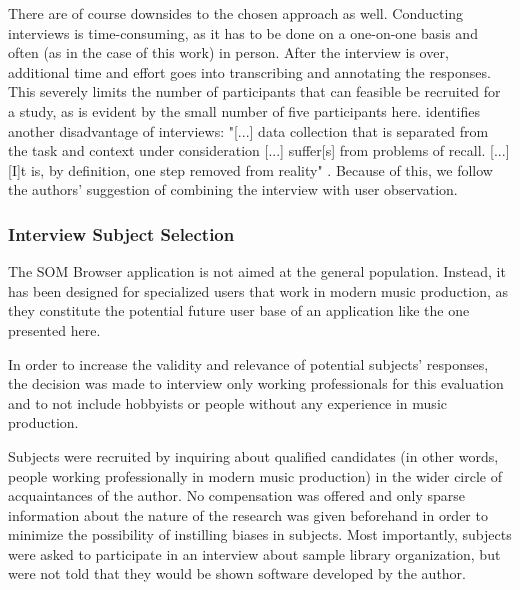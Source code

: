 \smallskip

There are of course downsides to the chosen approach as well. Conducting
interviews is time-consuming, as it has to be done on a one-on-one basis and
often (as in the case of this work) in person. After the interview is over,
additional time and effort goes into transcribing and annotating the responses.
This severely limits the number of participants that can feasible be recruited
for a study, as is evident by the small number of five participants here.
\citet{lazar2017} identifies another disadvantage of interviews: "[...] data
collection that is separated from the task and context under consideration [...]
suffer[s] from problems of recall. [...] [I]t is, by definition, one step
removed from reality" \citep[p.188ff.]{lazar2017}. Because of this, we follow
the authors' suggestion of combining the interview with user observation.

\subsubsection{Interview Subject Selection}
\label{subsubsec:subject_selection}
The SOM Browser application is not aimed at the general population. Instead, it
has been designed for specialized users that work in modern music production, as
they constitute the potential future user base of an application like the one
presented here.

\smallskip

In order to increase the validity and relevance of potential subjects'
responses, the decision was made to interview only working professionals for
this evaluation and to not include hobbyists or people without any experience in
music production.

\smallskip

Subjects were recruited by inquiring about qualified candidates (in other words,
people working professionally in modern music production) in the wider circle of
acquaintances of the author. No compensation was offered and only sparse
information about the nature of the research was given beforehand in order to
minimize the possibility of instilling biases in subjects. Most importantly,
subjects were asked to participate in an interview about sample library
organization, but were not told that they would be shown software developed by
the author.

